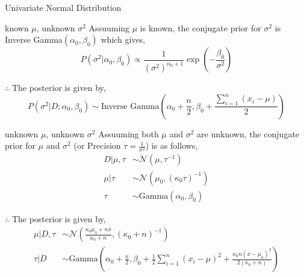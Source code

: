 \documentclass{beamer}
\begin{document}
\begin{section}{Univariate Normal Distribution}
    \begin{frame}{known $\mu$, unknown $\sigma^2$}
        Assuuming $\mu$ is known, the conjugate prior for $\sigma^2$ is Inverse Gamma$(\alpha_0, \beta_0)$ which gives,
        \begin{equation*}
            P(\sigma^2|\alpha_0, \beta_0) \propto \frac{1}{(\sigma^2)^{\alpha_0 + 1}} \exp\left(-\frac{\beta_0}{\sigma^2}\right)
        \end{equation*}

        $\therefore$ The posterior is given by,
        \begin{equation*}
            P(\sigma^2|D; \alpha_0, \beta_0) \sim \text{Inverse Gamma} \left( \alpha_0 + \frac{n}{2}, \beta_0 + \frac{\sum_{i=1}^n (x_i-\mu)}{2} \right)
        \end{equation*}
    \end{frame}

    \begin{frame}{unknown $\mu$, unknown $\sigma^2$}
        Assuuming both $\mu$ and $\sigma^2$ are unknown, the conjugate prior for $\mu$ and $\sigma^2$ (or Precision $\tau = \frac{1}{\sigma^2}$) is as follows,
        \begin{align*}
            D | \mu, \tau &\sim \mathcal{N}(\mu, \tau^{-1}) \\
            \mu | \tau &\sim \mathcal{N}(\mu_0, (\kappa_0\tau)^{-1}) \\
            \tau &\sim \text{Gamma}(\alpha_0, \beta_0)
        \end{align*}

        $\therefore$ The posterior is given by,
        \begin{align*}
            \mu | D, \tau &\sim \mathcal{N} \left( \frac{\kappa_0\mu_0 + n\bar{x}}{\kappa_0 + n}, \left( \kappa_0 + n \right)^{-1} \right) \\
            \tau | D &\sim \text{Gamma} \left( \alpha_0 + \frac{n}{2}, \beta_0 + \frac{1}{2}\sum_{i=1}^n (x_i-\mu)^2 + \frac{\kappa_0n(\bar{x}-\mu_0)^2}{2(\kappa_0 + n)} \right)
        \end{align*}
    \end{frame}
\end{section}
\end{document}
